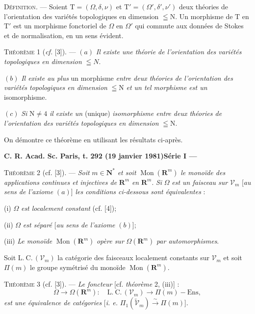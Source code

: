 \textsc{Définition}. --- Soient $\mathrm{T}=(\Omega,\delta,\nu)$ et $\mathrm{T}'=(\Omega',\delta',\nu')$ deux théories de l'orientation des variétés topologiques en dimension $\leqq\mathrm{N}$. Un morphisme de $\mathrm{T}$ en $\mathrm{T}'$ est un morphisme fonctoriel de $\Omega$ en $\Omega'$ qui commute aux données de Stokes et de normalisation, en un sens évident.

\textsc{Théorème} 1 (\textit{cf.} [3]). --- $(a)$ \textit{Il existe une théorie de l'orientation des variétés topologiques en dimension} $\leqq N$.

$(b)$ \textit{Il existe au plus} un morphisme \textit{entre deux théories de l'orientation des variétés topologiques en dimension} $\leqq\mathrm{N}$ \textit{et un tel morphisme est un} isomorphisme.

$(c)$ \textit{Si} $\mathrm{N}\ne4$ \textit{il existe un} (unique) \textit{isomorphisme entre deux théories de l'orientation des variétés topologiques en dimension} $\leqq\mathrm{N}$.

On démontre ce théorème en utilisant les résultats ci-après.

\textbf{C. R. Acad. Sc. Paris, t. 292 (19 janvier 1981)\hfill Série I --- }

\textsc{Théorème} 2 (cf. [3]). --- \textit{Soit} $m\in\mathbf{N}^{*}$ \textit{et soit} $\operatorname{Mon}(\mathbf{R}^m)$ \textit{le monoïde des applications continues et injectives de} $\mathbf{R}^m$ \textit{en} $\mathbf{R}^m$. \textit{Si} $\Omega$ \textit{est un faisceau sur} $\mathscr{V}_m$ [\textit{au sens de l'axiome} $(a)$] \textit{les conditions ci-dessous sont équivalentes} :

(i) $\Omega$ \textit{est localement constant} (cf. [4]);

(ii) $\Omega$ \textit{est séparé} [\textit{au sens de l'axiome} $(b)$];

(iii) \textit{Le monoïde} $\operatorname{Mon}(\mathbf{R}^m)$ \textit{opère sur} $\Omega(\mathbf{R}^m)$ \textit{par automorphismes}.

Soit $\mathrm{L.\ C.}\,(\mathscr{V}_m)$ la catégorie des faisceaux localement constants sur $\mathscr{V}_m$ et soit $\Pi(m)$ le groupe symétrisé du monoïde $\operatorname{Mon}(\mathbf{R}^m)$.

\textsc{Théorème} 3 (cf. [3]). --- \textit{Le foncteur} [cf. \textit{théorème} 2, (iii)] :
\[
\Omega\to\Omega(\mathbf{R}^m):\quad\mathrm{L.\ C.}\,(\mathscr{V}_m)\to\Pi(m)-\mathrm{Ens},
\]
\textit{est une équivalence de catégories} [\textit{i. e.} $\Pi_1(\tilde{\mathscr{V}}_m)\overset{\sim}{\to}\Pi(m)$].


